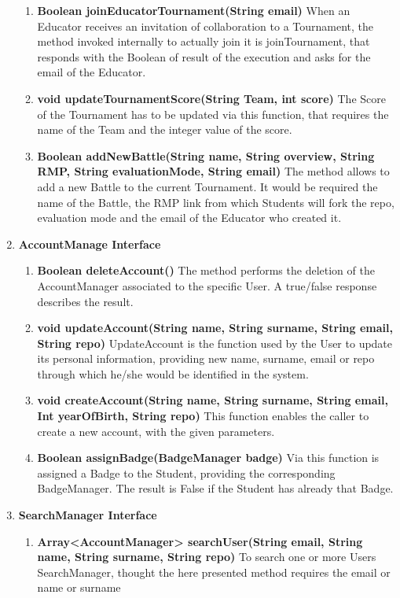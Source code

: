\begin{enumerate}
\begin{enumerate}[label=$\bullet$]
        \item \textbf{Boolean joinEducatorTournament(String email)} When an Educator receives an invitation of collaboration to a Tournament, the method invoked internally to actually join it is joinTournament, that responds with the 
        Boolean of result of the execution and asks for the email of the Educator.
        \item \textbf{void updateTournamentScore(String Team, int score)} The Score of the Tournament has to be updated via this function, that requires the name of the Team and the integer value of the score.
        \item \textbf{Boolean addNewBattle(String name, String overview, String RMP, String evaluationMode, String email)} The method allows to add a new Battle to the current Tournament. It would be required the name of the Battle, 
        the RMP link from which Students will fork the repo, evaluation mode and the email of the Educator who created it.
        \end{enumerate}
    \item \textbf{AccountManage Interface} 
        \begin{enumerate}[label=$\bullet$]
            \item \textbf{Boolean deleteAccount()} The method performs the deletion of the AccountManager associated to the specific User. A true/false response describes the result.
            \item \textbf{void updateAccount(String name, String surname, String email, String repo)} UpdateAccount is the function used by the User to update its personal information, providing new name, surname, email or repo 
            through which he/she would be identified in the system.
            \item \textbf{void createAccount(String name, String surname, String email, Int yearOfBirth, String repo)} This function enables the caller to create a new account, with the given parameters.
            \item \textbf{Boolean assignBadge(BadgeManager badge)} Via this function is assigned a Badge to the Student, providing the corresponding BadgeManager. The result is False if the Student has already that Badge.
        \end{enumerate}
    \item \textbf{SearchManager Interface} 
        \begin{enumerate}[label=$\bullet$]
            \item \textbf{Array<AccountManager> searchUser(String email, String name, String surname, String repo)} To search one or more Users SearchManager, thought the here presented method requires the email or name or surname

\end{enumerate}
\end{enumerate}
